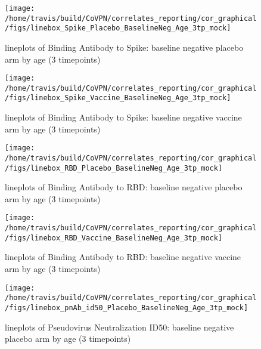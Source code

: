 \documentclass[]{book}
\theoremstyle{definition}
\theoremstyle{definition}
\theoremstyle{definition}
\newcommand{\1}{\mathbbm{1}}
\begin{document}
\clearpage
\begin{figure}[H]

{\centering \texttt{[image: /home/travis/build/CoVPN/correlates\_reporting/cor\_graphical/figs/linebox\_Spike\_Placebo\_BaselineNeg\_Age\_3tp\_mock]} 

}

\caption{lineplots of Binding Antibody to Spike: baseline negative placebo arm by age (3 timepoints)}\label{fig:unnamed-chunk-75}
\end{figure}

\clearpage
\begin{figure}[H]

{\centering \texttt{[image: /home/travis/build/CoVPN/correlates\_reporting/cor\_graphical/figs/linebox\_Spike\_Vaccine\_BaselineNeg\_Age\_3tp\_mock]} 

}

\caption{lineplots of Binding Antibody to Spike: baseline negative vaccine arm by age (3 timepoints)}\label{fig:unnamed-chunk-76}
\end{figure}

\clearpage
\begin{figure}[H]

{\centering \texttt{[image: /home/travis/build/CoVPN/correlates\_reporting/cor\_graphical/figs/linebox\_RBD\_Placebo\_BaselineNeg\_Age\_3tp\_mock]} 

}

\caption{lineplots of Binding Antibody to RBD: baseline negative placebo arm by age (3 timepoints)}\label{fig:unnamed-chunk-77}
\end{figure}

\clearpage
\begin{figure}[H]

{\centering \texttt{[image: /home/travis/build/CoVPN/correlates\_reporting/cor\_graphical/figs/linebox\_RBD\_Vaccine\_BaselineNeg\_Age\_3tp\_mock]} 

}

\caption{lineplots of Binding Antibody to RBD: baseline negative vaccine arm by age (3 timepoints)}\label{fig:unnamed-chunk-78}
\end{figure}

\clearpage
\begin{figure}[H]

{\centering \texttt{[image: /home/travis/build/CoVPN/correlates\_reporting/cor\_graphical/figs/linebox\_pnAb\_id50\_Placebo\_BaselineNeg\_Age\_3tp\_mock]} 

}

\caption{lineplots of Pseudovirus Neutralization ID50: baseline negative placebo arm by age (3 timepoints)}\label{fig:unnamed-chunk-79}
\end{figure}
\end{document}
